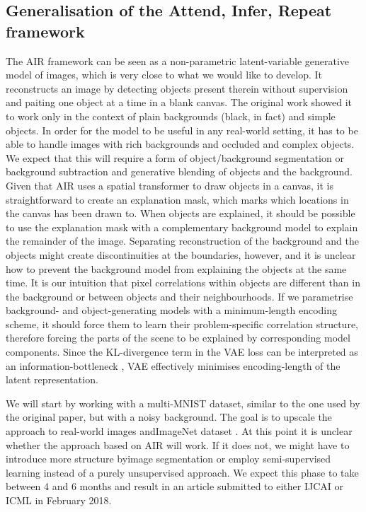     \subsection{Generalisation of the Attend, Infer, Repeat framework}
        The AIR framework can be seen as a non-parametric latent-variable generative model of images, which is very close to what we would like to develop.
        It reconstructs an image by detecting objects present therein without supervision and paiting one object at a time in a blank canvas.
        The original work showed it to work only in the context of plain backgrounds (black, in fact) and simple objects.
        In order for the model to be useful in any real-world setting, it has to be able to handle images with rich backgrounds and occluded and complex objects. 
        We expect that this will require a form of object/background segmentation or background subtraction and generative blending of objects and the background.  
        Given that AIR uses a spatial transformer \citep{Jaderberg2015} to draw objects in a canvas, it is straightforward to create an explanation mask, which marks which locations in the canvas has been drawn to. 
        When objects are explained, it should be possible to use the explanation mask with a complementary background model to explain the remainder of the image.
        Separating reconstruction of the background and the objects might create discontinuities at the boundaries, however, and it is unclear how to prevent the background model from explaining the objects at the same time.
        It is our intuition that pixel correlations within objects are different than in the background or between objects and their neighbourhoods.
        If we parametrise background- and object-generating models with a minimum-length encoding scheme, it should force them to learn their problem-specific correlation structure, therefore forcing the parts of the scene to be explained by corresponding model components.
        Since the KL-divergence term in the VAE loss can be interpreted as an information-bottleneck \citep{Achille2016}, VAE effectively minimises encoding-length of the latent representation.
        
        We will start by working with a multi-MNIST dataset, similar to the one used by the original paper, but with a noisy background. 
        The goal is to upscale the approach to real-world images and\eg ImageNet dataset \citep{Russakovsky2015}.
        At this point it is unclear whether the approach based on AIR will work. If it does not, we might have to introduce more structure by\!\eg image segmentation or employ semi-supervised learning instead of a purely unsupervised approach.
        We expect this phase to take between 4 and 6 months and result in an article submitted to either IJCAI or ICML in February 2018.
    
